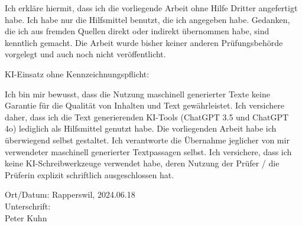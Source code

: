 

Ich erkläre hiermit, dass ich die vorliegende Arbeit ohne Hilfe Dritter angefertigt habe. Ich habe nur die Hilfsmittel benutzt, die ich angegeben habe. Gedanken, die ich aus fremden Quellen direkt oder indirekt übernommen habe, sind kenntlich gemacht. Die Arbeit wurde bisher keiner anderen Prüfungsbehörde vorgelegt und auch noch nicht veröffentlicht.

KI-Einsatz ohne Kennzeichnungspflicht:

Ich bin mir bewusst, dass die Nutzung maschinell generierter Texte keine Garantie für die Qualität von Inhalten und Text gewährleistet. Ich versichere daher, dass ich die Text generierenden KI-Tools (ChatGPT 3.5 und ChatGPT 4o) lediglich als Hilfsmittel genutzt habe. Die vorliegenden Arbeit habe ich überwiegend selbst gestaltet. Ich verantworte die Übernahme jeglicher von mir verwendeter maschinell generierter Textpassagen selbst. Ich versichere, dass ich keine KI-Schreibwerkzeuge verwendet habe, deren Nutzung der Prüfer / die Prüferin explizit schriftlich ausgeschlossen hat.



Ort/Datum: Rapperswil, 2024.06.18 \\
Unterschrift:\\
Peter Kuhn
